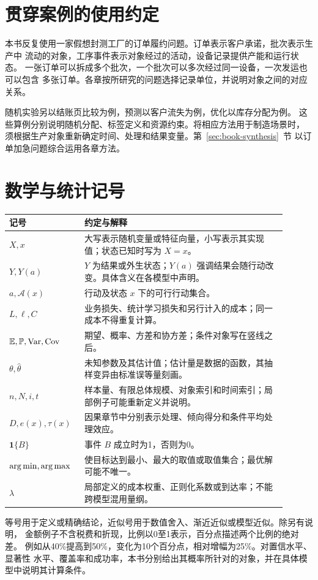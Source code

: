\section*{贯穿案例的使用约定}
本书反复使用一家假想封测工厂的订单履约问题。订单表示客户承诺，批次表示生产中
流动的对象，工序事件表示对象经过的活动，设备记录提供产能和运行状态。
一张订单可以拆成多个批次，一个批次可以多次经过同一设备，一次发运也可以包含
多张订单。各章按所研究的问题选择记录单位，并说明对象之间的对应关系。

随机实验另以结账页比较为例，预测以客户流失为例，优化以库存分配为例。
这些算例分别说明随机分配、标签定义和资源约束。将相应方法用于制造场景时，
须根据生产对象重新确定时间、处理和结果变量。第~\ref{sec:book-synthesis}~节
以订单加急问题综合运用各章方法。

\clearpage
\section*{数学与统计记号}
\begin{longtable}{P{0.22\linewidth}P{0.68\linewidth}}
\toprule
{}
记号 & 约定与解释\\
\midrule
\endhead
\(X,x\) & 大写表示随机变量或特征向量，小写表示其实现值；状态已知时写为 \(X=x\)。\\
\(Y,Y(a)\) & \(Y\) 为结果或外生状态；\(Y(a)\) 强调结果会随行动改变。具体含义在各模型中声明。\\
\(a,\mathcal A(x)\) & 行动及状态 \(x\) 下的可行行动集合。\\
\(L,\ell,C\) & 业务损失、统计学习损失和另行计入的成本；同一成本不得重复计算。\\
\(\mathbb E,\mathbb P,\operatorname{Var},\operatorname{Cov}\) & 期望、概率、方差和协方差；条件对象写在竖线之后。\\
\(\theta,\hat\theta\) & 未知参数及其估计值；估计量是数据的函数，其抽样变异由标准误等量刻画。\\
\(n,N,i,t\) & 样本量、有限总体规模、对象索引和时间索引；局部例子可能重新定义并说明。\\
\(D,e(x),\tau(x)\) & 因果章节中分别表示处理、倾向得分和条件平均处理效应。\\
\(\mathbf1\{B\}\) & 事件 \(B\) 成立时为1，否则为0。\\
\(\operatorname*{arg\,min},\operatorname*{arg\,max}\) & 使目标达到最小、最大的取值或取值集合；最优解可能不唯一。\\
\(\lambda\) & 局部定义的成本权重、正则化系数或到达率；不能跨模型混用量纲。\\
\bottomrule
\end{longtable}

等号用于定义或精确结论，近似号用于数值舍入、渐近近似或模型近似。除另有说明，
金额例子不含税费和折现，比例以0至1表示，百分点描述两个比例的绝对差。
例如从40\%提高到50\%，变化为10个百分点，相对增幅为25\%。对置信水平、显著性
水平、覆盖率和成功率，本书分别给出其概率所针对的对象，并在具体模型中说明其计算条件。
